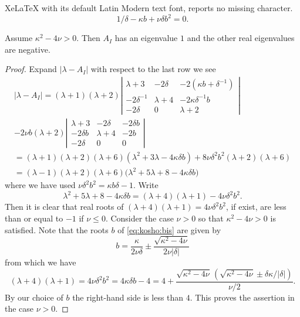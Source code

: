 \documentclass[10pt,a4paper]{amsart}
\def\la{\lambda}
\begin{document}
XeLaTeX with its default Latin Modern text font, reports no missing character.
\begin{equation}
\label{eq:kosho:bis}
1/\delta-\kappa b + \nu \delta b^2=0.
\end{equation}

\begin{lem}
\label{lem:koyuti} Assume $\kappa^2-4\nu> 0$. Then
$A_I$ has an eigenvalue $1$ and the other real eigenvalues are negative.
%
\end{lem}

\begin{proof} 
Expand $|\la-A_I|$ with respect to the last row we see
%
\begin{gather*}
|\la-A_I|=(\la+1)(\la+2)\left|\begin{array}{ccc}
\la+3&-2\delta&-2(\kappa b+\delta^{-1})\\
-2\delta^{-1}&\la+4&-2\kappa\delta^{-1}b\\
-2\delta&0&\la+2
\end{array}\right|\\
-2 \nu b (\la+2)\left|
\begin{array}{ccc}
\la+3&-2\delta&-2\delta b\\
-2\delta b&\la+4&-2b\\
-2\delta&0&0
\end{array}\right|\\
=(\la+1)(\la+2)(\la+6)(\la^2+3\la-4\kappa \delta b)+8\nu \delta^2 b^2(\la+2)(\la+6)\\
=(\la-1)(\la+2)(\la+6)\big(\la^2+5\la+8-4\kappa\delta b\big)
\end{gather*}
%
where we have used $\nu \delta^2 b^2=\kappa b\delta-1$.
Write
%
\[
\la^2+5\la+8-4\kappa\delta b=(\la+4)(\la+1)-4\nu\delta^2b^2.
\]
%
Then it is clear that real roots of $(\la+4)(\la+1)=4\nu\delta^2b^2$, if exist, are less than or equal to $-1$ if $\nu\leq 0$. Consider the case $\nu>0$ so that $\kappa^2-4\nu> 0$  is satisfied. Note that the roots  $b$ of \eqref{eq:kosho:bis} are given by
%
\[
b=\frac{\kappa}{2\nu\delta}\pm \frac{\sqrt{\kappa^2-4\nu}}{2\nu|\delta|}
\]
%
from which we have
%
\[
(\la+4)(\la+1)=4\nu\delta^2b^2=4\kappa\delta b-4=4+\frac{\sqrt{\kappa^2-4\nu}\,(\sqrt{\kappa^2-4\nu}\pm \delta \kappa/|\delta|)}{\nu/2}.
\]
%
%
By our choice of $b$ the right-hand side is less than $4$. This proves the assertion in the case $\nu>0$. 
\end{proof}
\end{document}
